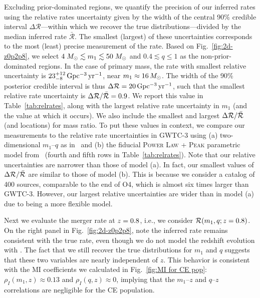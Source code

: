 \begin{refsection}
Excluding prior-dominated regions, we quantify the precision of our inferred rates using the relative rates uncertainty given by the width of the central 90\% credible interval $\Delta\mathcal{R}$---within which we recover the true distributions---divided by the median inferred rate $\bar{\mathcal{R}}$. The smallest (largest) of these uncertainties corresponds to the most (least) precise measurement of the rate. Based on Fig.~\ref{fig:2d-z0p2p8}, we select $4\;M_\odot \lesssim m_1 \lesssim 50 \;M_\odot$ and $0.4 \lesssim q \leq 1$ as the non-prior-dominated regions. In the case of primary mass, the rate with smallest relative uncertainty is $23^{+12}_{-8}\,\mathrm{Gpc^{-3}\,yr^{-1}}$, near $m_1\approx16\,M_\odot$. The width of the 90\% posterior credible interval is thus $\Delta\mathcal{R}=20\,\mathrm{Gpc^{-3}\,yr^{-1}}$, such that the smallest relative rate uncertainty is $\Delta\mathcal{R}/\bar{\mathcal{R}}=0.9$. We report this value in Table~\ref{tab:relrates}, along with the largest relative rate uncertainty in $m_1$ (and the value at which it occurs). We also include the smallest and largest $\Delta\mathcal{R}/\bar{\mathcal{R}}$ (and locations) for mass ratio. To put these values in context, we compare our measurements to the relative rate uncertainties in \acs{GWTC-3} using (a) two-dimensional $m_1$--$q$ \PixelPop as in~\citet{Heinzel:2024hva} and (b) the fiducial \textsc{Power Law + Peak} parametric model from~\citet{KAGRA:2021duu} (fourth and fifth rows in Table~\ref{tab:relrates}). Note that our relative uncertainties are narrower than those of model (a). In fact, our smallest values of $\Delta\mathcal{R}/\bar{\mathcal{R}}$ are similar to those of model (b). This is because we consider a catalog of 400 sources, comparable to the end of \ac{O4}, which is almost six times larger than \acs{GWTC-3}. However, our largest relative uncertainties are wider than in model (a) due to \PixelPop being a more flexible model.

Next we evaluate the merger rate at $z=0.8$, i.e., we consider $\mathcal{R}(m_1,q;z=0.8)$. On the right panel in Fig.~\ref{fig:2d-z0p2p8}, note the inferred rate remains consistent with the true rate, even though we do not model the redshift evolution with \PixelPop. The fact that we still recover the true distributions for $m_1$ and $q$ suggests that these two variables are nearly independent of $z$. This behavior is consistent with the \ac{MI} coefficients we calculated in Fig.~\ref{fig:MI for CE pop}: $\rho_I(m_1,z) \approx 0.13$ and $\rho_I(q,z) \approx 0$, implying that the $m_1$--$z$ and $q$--$z$ correlations are negligible for the \ac{CE} population.


\end{refsection}
